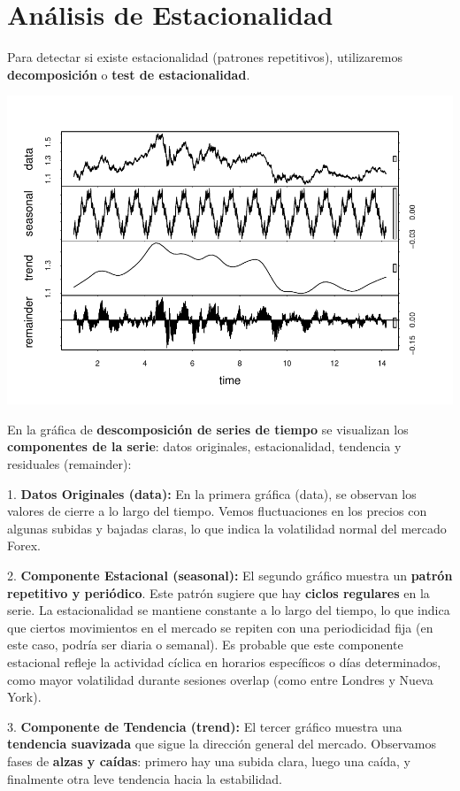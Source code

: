 \documentclass[
]{book}
\begin{document}
\section{Análisis de Estacionalidad}\label{anuxe1lisis-de-estacionalidad}

Para detectar si existe estacionalidad (patrones repetitivos), utilizaremos \textbf{decomposición} o \textbf{test de estacionalidad}.

\includegraphics{bookdown_time_series_files/figure-latex/unnamed-chunk-6-1.pdf}

En la gráfica de \textbf{descomposición de series de tiempo} se visualizan los \textbf{componentes de la serie}: datos originales, estacionalidad, tendencia y residuales (remainder):

1. \textbf{Datos Originales (data):} En la primera gráfica (data), se observan los valores de cierre a lo largo del tiempo. Vemos fluctuaciones en los precios con algunas subidas y bajadas claras, lo que indica la volatilidad normal del mercado Forex.

2. \textbf{Componente Estacional (seasonal):} El segundo gráfico muestra un \textbf{patrón repetitivo y periódico}. Este patrón sugiere que hay \textbf{ciclos regulares} en la serie. La estacionalidad se mantiene constante a lo largo del tiempo, lo que indica que ciertos movimientos en el mercado se repiten con una periodicidad fija (en este caso, podría ser diaria o semanal). Es probable que este componente estacional refleje la actividad cíclica en horarios específicos o días determinados, como mayor volatilidad durante sesiones overlap (como entre Londres y Nueva York).

3. \textbf{Componente de Tendencia (trend):} El tercer gráfico muestra una \textbf{tendencia suavizada} que sigue la dirección general del mercado. Observamos fases de \textbf{alzas y caídas}: primero hay una subida clara, luego una caída, y finalmente otra leve tendencia hacia la estabilidad.
\end{document}
